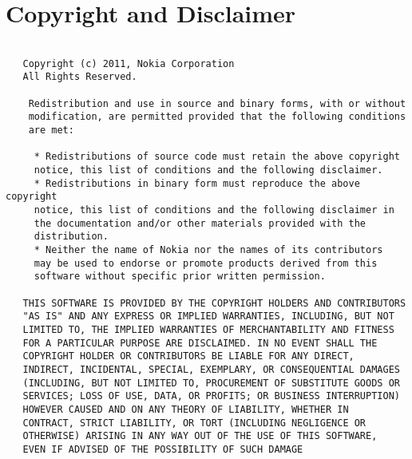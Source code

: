 \section{Copyright and Disclaimer}

\begin{verbatim}

   Copyright (c) 2011, Nokia Corporation
   All Rights Reserved.

    Redistribution and use in source and binary forms, with or without
    modification, are permitted provided that the following conditions
    are met:
 
     * Redistributions of source code must retain the above copyright
     notice, this list of conditions and the following disclaimer.
     * Redistributions in binary form must reproduce the above copyright
     notice, this list of conditions and the following disclaimer in
     the documentation and/or other materials provided with the
     distribution.
     * Neither the name of Nokia nor the names of its contributors
     may be used to endorse or promote products derived from this
     software without specific prior written permission.
 
   THIS SOFTWARE IS PROVIDED BY THE COPYRIGHT HOLDERS AND CONTRIBUTORS
   "AS IS" AND ANY EXPRESS OR IMPLIED WARRANTIES, INCLUDING, BUT NOT
   LIMITED TO, THE IMPLIED WARRANTIES OF MERCHANTABILITY AND FITNESS
   FOR A PARTICULAR PURPOSE ARE DISCLAIMED. IN NO EVENT SHALL THE
   COPYRIGHT HOLDER OR CONTRIBUTORS BE LIABLE FOR ANY DIRECT,
   INDIRECT, INCIDENTAL, SPECIAL, EXEMPLARY, OR CONSEQUENTIAL DAMAGES
   (INCLUDING, BUT NOT LIMITED TO, PROCUREMENT OF SUBSTITUTE GOODS OR
   SERVICES; LOSS OF USE, DATA, OR PROFITS; OR BUSINESS INTERRUPTION)
   HOWEVER CAUSED AND ON ANY THEORY OF LIABILITY, WHETHER IN
   CONTRACT, STRICT LIABILITY, OR TORT (INCLUDING NEGLIGENCE OR
   OTHERWISE) ARISING IN ANY WAY OUT OF THE USE OF THIS SOFTWARE,
   EVEN IF ADVISED OF THE POSSIBILITY OF SUCH DAMAGE

\end{verbatim}
